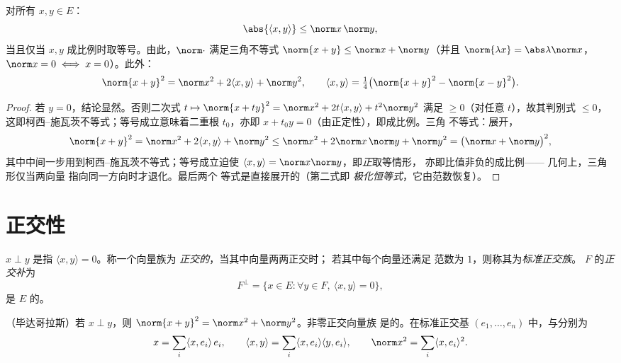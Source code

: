 \begin{theorem}\label{thm:b1:euclid:cs}
对所有 $x, y \in E$：
\[
\abs{\langle x, y\rangle} \leq \norm x\, \norm y ,
\]
当且仅当 $x, y$ 成比例时取等号。由此，$\norm\cdot$
满足三角不等式 $\norm{x + y} \leq \norm x + \norm
y$（并且 $\norm{\lambda x} = \abs\lambda \norm x$，$\norm x = 0 \iff
x = 0$）。此外：
\[
\norm{x+y}^2 = \norm x^2 + 2\langle x, y\rangle + \norm y^2,
\qquad
\langle x, y \rangle = \tfrac14\bigl(\norm{x+y}^2 -
\norm{x-y}^2\bigr) .
\]
\end{theorem}

\begin{proof}
若 $y = 0$，结论显然。否则二次式 $t
\mapsto \norm{x + ty}^2 = \norm x^2 + 2t\langle x, y\rangle + t^2
\norm y^2$ 满足 $\geq 0$（对任意 $t$），故其判别式 $\leq 0$，
这即柯西–施瓦茨不等式；等号成立意味着二重根 $t_0$，亦即
$x + t_0 y = 0$（由正定性），即成比例。三角
不等式：展开，
\[
\norm{x + y}^2 = \norm x^2 + 2\langle x, y\rangle + \norm y^2
\leq \norm x^2 + 2\norm x\,\norm y + \norm y^2
= \bigl(\norm x + \norm y\bigr)^2 ,
\]
其中中间一步用到柯西–施瓦茨不等式；等号成立迫使 $\langle
x, y\rangle = \norm x\norm y$，即\emph{正}取等情形，
亦即比值非负的成比例——
几何上，三角形仅当两向量
指向同一方向时才退化。最后两个
等式是直接展开的（第二式即
\emph{极化恒等式}，它由范数恢复）。
\end{proof}

\section{正交性}

\begin{definition}\label{def:b1:euclid:orthogonal}
$x \perp y$ 是指 $\langle x, y \rangle = 0$。称一个向量族为
\emph{正交的}，当其中向量两两正交时；
若其中每个向量还满足
范数为 $1$，则称其为\emph{标准正交族}。 $F$ 的\emph{正交补}为
\[
F^{\perp} = \{x \in E : \forall y \in F,\ \langle x, y\rangle =
0\},
\]
是 $E$ 的。
\end{definition}

\begin{proposition}\label{prop:b1:euclid:orthfree}
（毕达哥拉斯）若 $x \perp y$，则
$\norm{x+y}^2 = \norm x^2 + \norm y^2$。非零正交向量族
是的。在标准正交基 $(e_1, \dots,
e_n)$ 中，与分别为
\[
x = \sum_{i} \langle x, e_i\rangle\, e_i,
\qquad
\langle x, y \rangle = \sum_i \langle x, e_i\rangle \langle y,
e_i\rangle,
\qquad
\norm x^2 = \sum_i \langle x, e_i\rangle^2 .
\]
\end{proposition}


